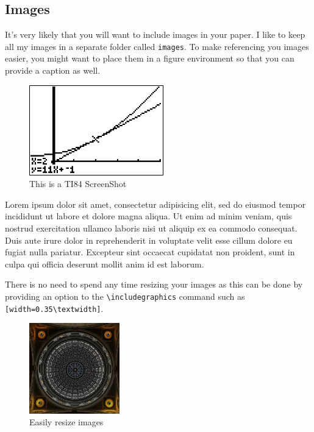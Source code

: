 \documentclass[a4paper,12pt]{article}
\begin{document}
\subsection*{Images}\label{subsec:images}

It's very likely that you will want to include images in your paper.  I like to keep all my images in a separate folder called \texttt{images}.  To make referencing you images easier, you might want to place them in a figure environment so that you can provide a caption as well.

\begin{figure}[ht!]
  \centering
  \includegraphics{./0-images/20170509-123642.png}
  \caption{This is a TI84 ScreenShot}\label{img:ti84screenshot1}
\end{figure}

Lorem ipsum dolor sit amet, consectetur adipisicing elit, sed do eiusmod tempor incididunt ut labore et dolore magna aliqua. Ut enim ad minim veniam, quis nostrud exercitation ullamco laboris nisi ut aliquip ex ea commodo consequat. Duis aute irure dolor in reprehenderit in voluptate velit esse cillum dolore eu fugiat nulla pariatur. Excepteur sint occaecat cupidatat non proident, sunt in culpa qui officia deserunt mollit anim id est laborum.

There is no need to spend any time resizing your images as this can be done by providing an option to the \verb!\includegraphics! command such as \verb![width=0.35\textwidth]!.  
\begin{figure}[h]
  \centering
  \includegraphics[width=0.35\textwidth]{./0-images/image.jpg}
  \caption{Easily resize images}
\end{figure}
\end{document}
